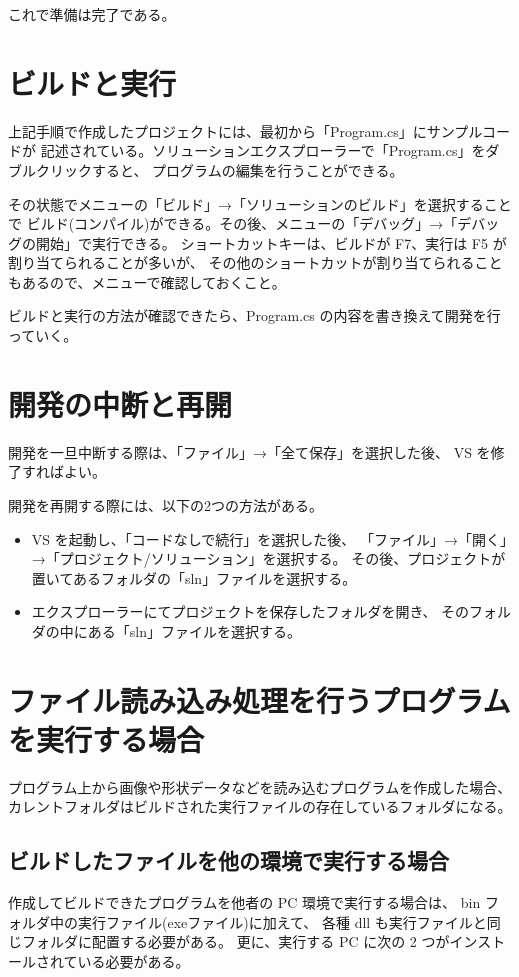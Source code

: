 \documentclass[a4paper]{jsarticle}
\begin{document}
これで準備は完了である。

\section{ビルドと実行}

上記手順で作成したプロジェクトには、最初から「Program.cs」にサンプルコードが
記述されている。ソリューションエクスプローラーで「Program.cs」をダブルクリックすると、
プログラムの編集を行うことができる。

その状態でメニューの「ビルド」→「ソリューションのビルド」を選択することで
ビルド(コンパイル)ができる。その後、メニューの「デバッグ」→「デバッグの開始」で実行できる。
ショートカットキーは、ビルドが F7、実行は F5 が割り当てられることが多いが、
その他のショートカットが割り当てられることもあるので、メニューで確認しておくこと。

ビルドと実行の方法が確認できたら、Program.cs の内容を書き換えて開発を行っていく。

\section{開発の中断と再開}

開発を一旦中断する際は、「ファイル」→「全て保存」を選択した後、
VS を修了すればよい。

開発を再開する際には、以下の2つの方法がある。

\begin{itemize}
 \item VS を起動し、「コードなしで続行」を選択した後、
	「ファイル」→「開く」→「プロジェクト/ソリューション」を選択する。
	その後、プロジェクトが置いてあるフォルダの「sln」ファイルを選択する。

 \item エクスプローラーにてプロジェクトを保存したフォルダを開き、
	そのフォルダの中にある「sln」ファイルを選択する。
\end{itemize}

\section{ファイル読み込み処理を行うプログラムを実行する場合}
プログラム上から画像や形状データなどを読み込むプログラムを作成した場合、
カレントフォルダはビルドされた実行ファイルの存在しているフォルダになる。

\subsection{ビルドしたファイルを他の環境で実行する場合}
作成してビルドできたプログラムを他者の PC 環境で実行する場合は、
bin フォルダ中の実行ファイル(exeファイル)に加えて、
各種 dll も実行ファイルと同じフォルダに配置する必要がある。
更に、実行する PC に次の 2 つがインストールされている必要がある。
\end{document}
